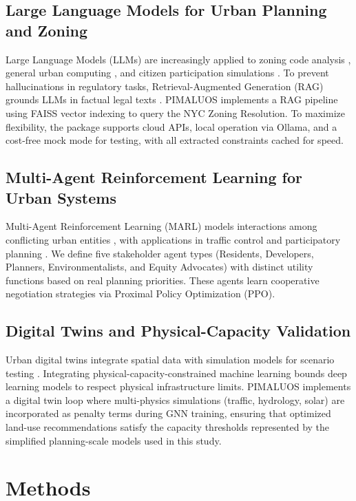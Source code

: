 \documentclass[final,3p,times]{elsarticle}
\begin{document}
\subsection{Large Language Models for Urban Planning and Zoning}
Large Language Models (LLMs) are increasingly applied to zoning code analysis \cite{zhang2024llmzoning}, general urban computing \cite{urban2025llm}, and citizen participation simulations \cite{dai2024simulating}. To prevent hallucinations in regulatory tasks, Retrieval-Augmented Generation (RAG) grounds LLMs in factual legal texts \cite{lewis2020rag}. PIMALUOS implements a RAG pipeline using FAISS vector indexing to query the NYC Zoning Resolution. To maximize flexibility, the package supports cloud APIs, local operation via Ollama, and a cost-free mock mode for testing, with all extracted constraints cached for speed.

\subsection{Multi-Agent Reinforcement Learning for Urban Systems}
Multi-Agent Reinforcement Learning (MARL) models interactions among conflicting urban entities \cite{zhang2021marl}, with applications in traffic control \cite{chu2020marl} and participatory planning \cite{li2024consensus}. We define five stakeholder agent types (Residents, Developers, Planners, Environmentalists, and Equity Advocates) with distinct utility functions based on real planning priorities. These agents learn cooperative negotiation strategies via Proximal Policy Optimization (PPO).

\subsection{Digital Twins and Physical-Capacity Validation}
Urban digital twins integrate spatial data with simulation models for scenario testing \cite{albalkhy2024digital}. Integrating physical-capacity-constrained machine learning \cite{karniadakis2021physics} bounds deep learning models to respect physical infrastructure limits. PIMALUOS implements a digital twin loop where multi-physics simulations (traffic, hydrology, solar) are incorporated as penalty terms during GNN training, ensuring that optimized land-use recommendations satisfy the capacity thresholds represented by the simplified planning-scale models used in this study.
\section{Methods}
\label{sec:methods}
\end{document}
